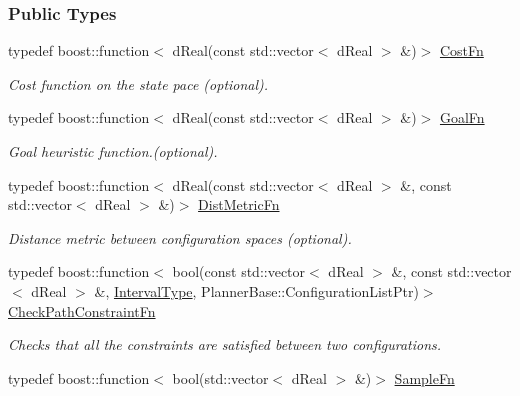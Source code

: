 \subsubsection*{Public Types}
\begin{DoxyCompactItemize}
\item 
typedef boost::function$<$ dReal(const std::vector$<$ dReal $>$ \&)$>$ \hyperlink{classOpenRAVE_1_1PlannerBase_1_1PlannerParameters_aaa75769bb0c706f4de9f59bc2a43f524}{CostFn}
\begin{DoxyCompactList}\small\item\em Cost function on the state pace (optional). \item\end{DoxyCompactList}\item 
typedef boost::function$<$ dReal(const std::vector$<$ dReal $>$ \&)$>$ \hyperlink{classOpenRAVE_1_1PlannerBase_1_1PlannerParameters_ac6a5c6b1eb0d15f3cd0f69f8d4871df3}{GoalFn}
\begin{DoxyCompactList}\small\item\em Goal heuristic function.(optional). \item\end{DoxyCompactList}\item 
typedef boost::function$<$ dReal(const std::vector$<$ dReal $>$ \&, const std::vector$<$ dReal $>$ \&)$>$ \hyperlink{classOpenRAVE_1_1PlannerBase_1_1PlannerParameters_a1e96b9c9b49635f5bfd32531e41fb0e8}{DistMetricFn}
\begin{DoxyCompactList}\small\item\em Distance metric between configuration spaces (optional). \item\end{DoxyCompactList}\item 
typedef boost::function$<$ bool(const std::vector$<$ dReal $>$ \&, const std::vector$<$ dReal $>$ \&, \hyperlink{namespaceOpenRAVE_a0d04dbfb6240509e26f8336ab1756937}{IntervalType}, PlannerBase::ConfigurationListPtr)$>$ \hyperlink{classOpenRAVE_1_1PlannerBase_1_1PlannerParameters_aca89abb7137aa4f3aa98065ce10f7f6a}{CheckPathConstraintFn}
\begin{DoxyCompactList}\small\item\em Checks that all the constraints are satisfied between two configurations. \item\end{DoxyCompactList}\item 
typedef boost::function$<$ bool(std::vector$<$ dReal $>$ \&)$>$ \hyperlink{classOpenRAVE_1_1PlannerBase_1_1PlannerParameters_a1b5ac1fcfcc5e5775ffbbc9c451541fd}{SampleFn}

\end{DoxyCompactItemize}
